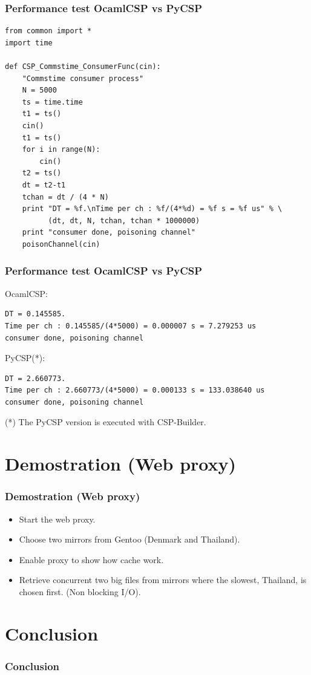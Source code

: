 \documentclass{beamer}
\begin{document}
\begin{frame}[fragile]
  \frametitle{Performance test OcamlCSP vs PyCSP}
  \tiny
\begin{verbatim}
from common import *
import time

def CSP_Commstime_ConsumerFunc(cin):
    "Commstime consumer process"
    N = 5000
    ts = time.time
    t1 = ts()
    cin()
    t1 = ts()
    for i in range(N):
        cin()
    t2 = ts()
    dt = t2-t1
    tchan = dt / (4 * N)
    print "DT = %f.\nTime per ch : %f/(4*%d) = %f s = %f us" % \
          (dt, dt, N, tchan, tchan * 1000000)
    print "consumer done, poisoning channel"
    poisonChannel(cin)
\end{verbatim}
  \normalsize
\end{frame}

\begin{frame}[fragile]
  \frametitle{Performance test OcamlCSP vs PyCSP}
OcamlCSP:
\tiny
\begin{verbatim}
DT = 0.145585.
Time per ch : 0.145585/(4*5000) = 0.000007 s = 7.279253 us
consumer done, poisoning channel
\end{verbatim}
\normalsize
PyCSP(*):
\tiny
\begin{verbatim}
DT = 2.660773.
Time per ch : 2.660773/(4*5000) = 0.000133 s = 133.038640 us
consumer done, poisoning channel
\end{verbatim}
\normalsize
(*) The PyCSP version is executed with CSP-Builder.
\end{frame}


\section[Demo]{Demostration (Web proxy)}
\begin{frame}
  \frametitle{Demostration (Web proxy)}
  \begin{itemize}
    \item Start the web proxy.
    \item Choose two mirrors from Gentoo (Denmark and Thailand).
    \item Enable proxy to show how cache work.
    \item Retrieve concurrent two big files from mirrors where the slowest,
      Thailand, is chosen first. (Non blocking I/O).
  \end{itemize}
\end{frame}


\section[Conclusion]{Conclusion}
\begin{frame}
  \frametitle{Conclusion}
\end{frame}
\end{document}
